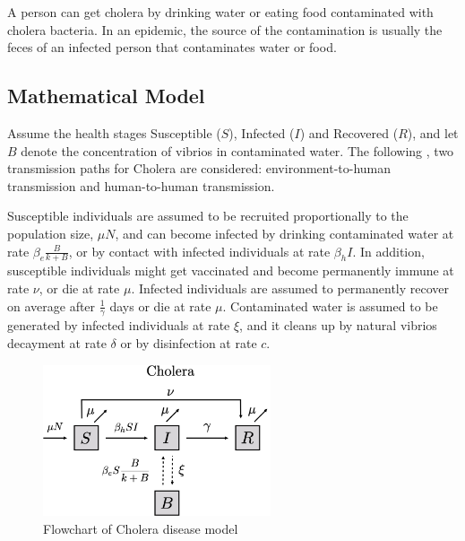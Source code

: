 \documentclass{book}
\begin{document}
A person can get cholera by drinking water or eating food contaminated with cholera bacteria. In an epidemic, the source of the contamination is usually the feces of an infected person that contaminates water or food.

\subsection*{Mathematical Model}
Assume the health stages Susceptible ($S$), Infected ($I$) and Recovered ($R$), and let $B$ denote the concentration of vibrios in contaminated water. The following \cite{sun2017transmission}, two transmission paths for Cholera are considered: environment-to-human transmission and human-to-human transmission.

Susceptible individuals are assumed to be recruited proportionally to the population size, $\mu N$, and can become infected by drinking contaminated water at rate $\beta_{e}\frac{B}{k+B}$, or by contact with infected individuals at rate $\beta_{h}I$. In addition, susceptible individuals might get vaccinated and become permanently immune at rate $\nu$, or die at rate $\mu$.
Infected individuals are assumed to permanently recover on average after $\frac{1}{\gamma}$ days or die at rate $\mu$.
Contaminated water is assumed to be generated by infected individuals at rate $\xi$, and it cleans up by natural vibrios decayment at rate $\delta$ or by disinfection at rate $c$.

\begin{figure}
    \centering
    \includegraphics[width = 0.6\textwidth]{Flowcharts/cholera.png}
    \caption{Flowchart of Cholera disease model}
    \label{fig:cholera_flow}
\end{figure}
\end{document}
